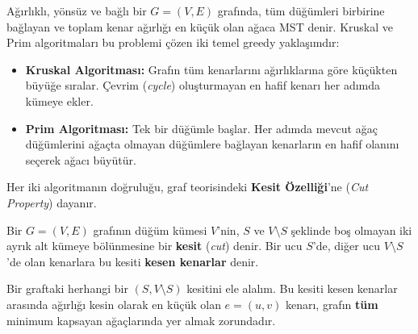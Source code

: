 Ağırlıklı, yönsüz ve bağlı bir $G = (V, E)$ grafında, tüm düğümleri birbirine bağlayan ve toplam kenar ağırlığı en küçük olan ağaca MST denir. Kruskal ve Prim algoritmaları bu problemi çözen iki temel greedy yaklaşımdır:
\begin{itemize}
    \item \textbf{Kruskal Algoritması:} Grafın tüm kenarlarını ağırlıklarına göre küçükten büyüğe sıralar. Çevrim (\textit{cycle}) oluşturmayan en hafif kenarı her adımda kümeye ekler.
    \item \textbf{Prim Algoritması:} Tek bir düğümle başlar. Her adımda mevcut ağaç düğümlerini ağaçta olmayan düğümlere bağlayan kenarların en hafif olanını seçerek ağacı büyütür.
\end{itemize}

Her iki algoritmanın doğruluğu, graf teorisindeki \textbf{Kesit Özelliği}'ne (\textit{Cut Property}) dayanır.

\begin{definition}
Bir $G = (V, E)$ grafının düğüm kümesi $V$'nin, $S$ ve $V \setminus S$ şeklinde boş olmayan iki ayrık alt kümeye bölünmesine bir \textbf{kesit} (\textit{cut}) denir. Bir ucu $S$'de, diğer ucu $V \setminus S$'de olan kenarlara bu kesiti \textbf{kesen kenarlar} denir.
\end{definition}

\begin{theorem}
Bir graftaki herhangi bir $(S, V \setminus S)$ kesitini ele alalım. Bu kesiti kesen kenarlar arasında ağırlığı kesin olarak en küçük olan $e = (u, v)$ kenarı, grafın \textbf{tüm} minimum kapsayan ağaçlarında yer almak zorundadır.
\end{theorem}

